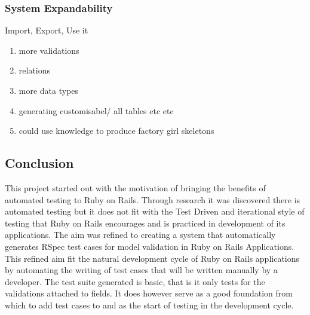 \documentclass[a4paper,12pt]{article}
\begin{document}
\subsubsection{System Expandability}
\par Import, Export, Use it

\begin{enumerate}
\item more validations
\item relations
\item more data types
\item generating customisabel/ all tables etc etc
\item could use knowledge to produce factory girl skeletons
\end{enumerate}
\subsection{Conclusion}

\par This project started out with the motivation of bringing the benefits of automated testing to Ruby on Rails. Through research it was discovered there is automated testing but it does not fit with the Test Driven  and iterational style of testing that Ruby on Rails encourages and is practiced in development of its applications. The aim was refined to creating a system that automatically generates RSpec test cases for model validation in Ruby on Rails Applications. This refined aim fit the natural development cycle of Ruby on Rails applications by automating the writing of test cases that will be written manually by a developer. The test suite generated is basic, that is it only tests for the validations attached to fields. It does however serve as a good foundation from which to add test cases to and as the start of testing in the development cycle.
\end{document}
